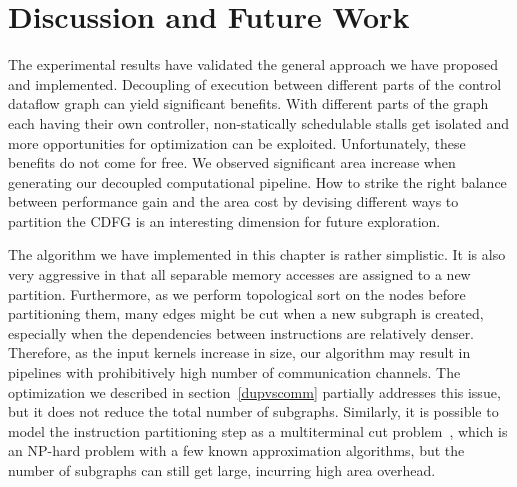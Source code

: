 \section{Discussion and Future Work}
The experimental results have validated the general approach we have proposed and implemented. 
Decoupling of execution between different parts of the control dataflow graph can yield
significant benefits. With different parts of the graph each having their own controller, non-statically schedulable stalls get isolated and more opportunities for
optimization can be exploited. Unfortunately, these benefits do not come for free. We observed significant area increase when generating our decoupled computational pipeline.
How to strike the right balance between performance gain and the area cost by devising different ways to partition the CDFG is an interesting dimension for future exploration.

The algorithm we have implemented in this chapter is rather simplistic. 
It is also very aggressive in that all separable memory accesses are assigned to a new partition.
Furthermore, as we perform topological sort on the nodes before partitioning them, many
edges might be cut when a new subgraph is created, especially when the dependencies between instructions are relatively denser.
Therefore, as the input kernels increase in size, our algorithm may result in pipelines with prohibitively high number of communication channels. The optimization we described in section~\ref{dupvscomm}
partially addresses this issue, but it does not reduce the total number of subgraphs. Similarly, it is possible to model the instruction partitioning
step as a multiterminal cut problem~\cite{multicut}, which is an NP-hard problem with a few known approximation algorithms, but the number of subgraphs
can still get large, incurring high area overhead.

